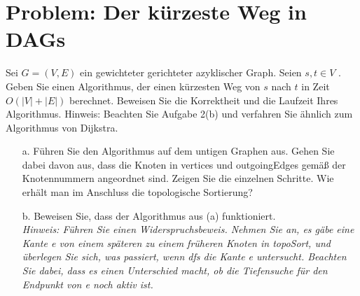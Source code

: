 \section{Problem: Der kürzeste Weg in DAGs}

\vspace{0.5em}
Sei $G = (V, E)$ ein gewichteter gerichteter azyklischer Graph. Seien $s, t \in V$ . Geben
Sie einen Algorithmus, der einen kürzesten Weg von $s$ nach $t$ in Zeit $O(|V | + |E|)$
berechnet. Beweisen Sie die Korrektheit und die Laufzeit Ihres Algorithmus.
Hinweis: Beachten Sie Aufgabe 2(b) und verfahren Sie ähnlich zum Algorithmus
von Dijkstra.

\begin{enumerate}
	\item[a.] Führen Sie den Algorithmus auf dem untigen Graphen aus. Gehen Sie dabei davon aus, dass die Knoten in vertices und outgoingEdges gemäß der Knotennummern angeordnet sind. Zeigen Sie die einzelnen Schritte. Wie erhält man im Anschluss die topologische Sortierung?
	\item[b.] Beweisen Sie, dass der Algorithmus aus (a) funktioniert.\\
	\textit{Hinweis: Führen Sie einen Widerspruchsbeweis. Nehmen Sie an, es gäbe eine Kante e von einem späteren zu einem früheren Knoten in topoSort, und überlegen Sie sich, was passiert, wenn dfs die Kante e untersucht. Beachten Sie dabei, dass es einen Unterschied macht, ob die Tiefensuche für den Endpunkt von e noch aktiv ist.}
\end{enumerate}